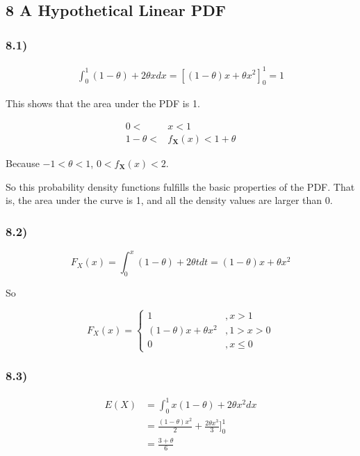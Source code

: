 \documentclass[
]{article}
\begin{document}
\hypertarget{a-hypothetical-linear-pdf}{%
\subsection{8 A Hypothetical Linear
PDF}\label{a-hypothetical-linear-pdf}}

\hypertarget{section-11}{%
\subsubsection{8.1)}\label{section-11}}

\[
\begin{aligned}
\int_0^1 (1 - \theta) + 2\theta x dx = [(1-\theta)x + \theta x^2 ]_0^1 = 1
\end{aligned}
\]

This shows that the area under the PDF is 1.

\[
\begin{aligned}
0 < &x<1 \\
1- \theta < &f_\mathbf{X}(x) < 1 + \theta
\end{aligned}
\]

Because \(-1 < \theta < 1\), \(0 < f_\mathbf{X}(x) < 2\).

So this probability density functions fulfills the basic properties of
the PDF. That is, the area under the curve is 1, and all the density
values are larger than 0.

\hypertarget{section-12}{%
\subsubsection{8.2)}\label{section-12}}

\[
F_X(x) = \int_0^x(1-\theta) + 2\theta t dt = (1-\theta)x + \theta x^2
\]

So

\[
F_X(x) = \begin{cases}
1 &, x > 1 \\
(1-\theta) x + \theta x^2 &, 1 > x > 0 \\
0 &, x\leq0
\end{cases}
\]

\hypertarget{section-13}{%
\subsubsection{8.3)}\label{section-13}}

\[
\begin{aligned}
E(X) &= \int_0^1 x(1-\theta) + 2\theta x^2 dx \\
&= \frac{(1-\theta)x^2}{2} + \frac{2\theta x^3}{3} \rbrack_0^1 \\
& = \frac{3 + \theta}{6}
\end{aligned}
\]
\end{document}
